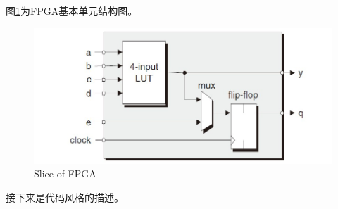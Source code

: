 图\ref{FPGA结构}为FPGA基本单元结构图。
\begin{figure}[H] %
    \centering
    \includegraphics{img/FPGA.jpg}
    \caption{Slice of FPGA} %
    \label{FPGA结构} %
\end{figure}
接下来是代码风格的描述。